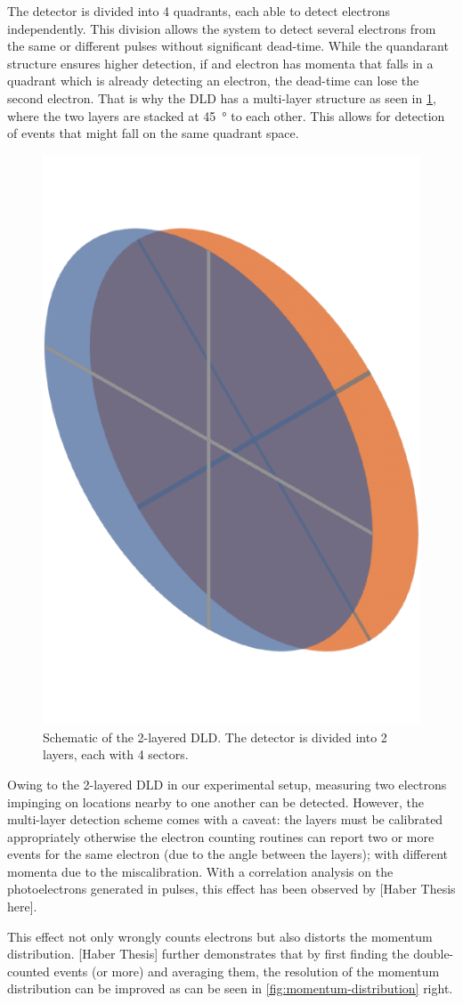 The detector is divided into \num{4} quadrants, each able to detect electrons independently. This division allows the system to detect several electrons from the same or different pulses without significant dead-time. While the quandarant structure ensures higher detection, if and electron has momenta that falls in a quadrant which is already detecting an electron, the dead-time can lose the second electron. That is why the \gls{DLD} has a multi-layer structure as seen in \cref{fig:sectors}, where the two layers are stacked at \qty{45}{\degree} to each other. This allows for detection of events that might fall on the same quadrant space.

\begin{figure}[h]
    \centering
    \includegraphics[width=0.3\linewidth]{images/sectors_figure.pdf}
    \caption{Schematic of the 2-layered DLD. The detector is divided into 2 layers, each with 4 sectors.}
    \label{fig:sectors}
\end{figure}

Owing to the 2-layered \gls{DLD} in our experimental setup, measuring two electrons impinging on locations nearby to one another can be detected. However, the multi-layer detection scheme comes with a caveat: the layers must be calibrated appropriately otherwise the electron counting routines can report two or more events for the same electron (due to the angle between the layers); with different momenta due to the miscalibration. With a correlation analysis on the photoelectrons generated in pulses, this effect has been observed by [Haber Thesis here]. 

This effect not only wrongly counts electrons but also distorts the momentum distribution. [Haber Thesis] further demonstrates that by first finding the double-counted events (or more) and averaging them, the resolution of the momentum distribution can be improved as can be seen in \cref{fig:momentum-distribution} right.

